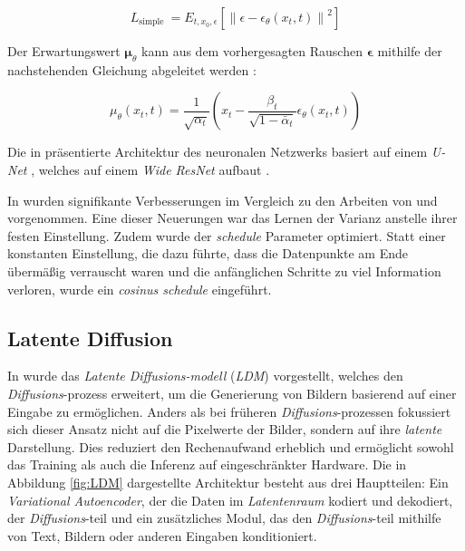 \documentclass[
  a4paper,  %
  twoside,  %
  bibliography=totoc,
  headsepline,
  cleardoublepage=empty,
  parskip=half,
  draft=false
]{scrbook}
\begin{document}
{\begin{equation}
    L_{\text {simple }}=E_{t, x_0, \epsilon}\left[\left\|\epsilon-\epsilon_\theta\left(x_t, t\right)\right\|^2\right]
\end{equation}

Der Erwartungswert $\boldsymbol{\mu}_\theta$ kann aus dem vorhergesagten Rauschen $\boldsymbol{\epsilon}$ mithilfe der nachstehenden Gleichung abgeleitet werden \cite{ho_denoising_2020}:

\begin{equation}
    \mu_\theta\left(x_t, t\right)=\frac{1}{\sqrt{\alpha_t}}\left(x_t-\frac{\beta_t}{\sqrt{1-\bar{\alpha}_t}} \epsilon_\theta\left(x_t, t\right)\right)
\end{equation}

Die in \cite{ho_denoising_2020} präsentierte Architektur des neuronalen Netzwerks basiert auf einem \emph{U-Net} \cite{ronneberger_u-net_2015}, welches auf einem \emph{Wide ResNet} \cite{zagoruyko_wide_2017} aufbaut \cite{ho_denoising_2020}.

In \cite{nichol_improved_2021} wurden signifikante Verbesserungen im Vergleich zu den Arbeiten von \cite{sohl-dickstein_deep_2015} und \cite{ho_denoising_2020} vorgenommen. Eine dieser Neuerungen war das Lernen der Varianz anstelle ihrer festen Einstellung. Zudem wurde der \emph{schedule} Parameter optimiert. Statt einer konstanten Einstellung, die dazu führte, dass die Datenpunkte am Ende übermäßig verrauscht waren und die anfänglichen Schritte zu viel Information verloren, wurde ein \emph{cosinus schedule} eingeführt. \cite{nichol_improved_2021}

\subsection{Latente Diffusion}

In \cite{rombach_high-resolution_2022} wurde das \emph{Latente \emph{Diffusions}-modell} (\emph{LDM}) vorgestellt, welches den \emph{Diffusions}-prozess \cite{sohl-dickstein_deep_2015, ho_denoising_2020, nichol_improved_2021, dhariwal_diffusion_2021} erweitert, um die Generierung von Bildern basierend auf einer Eingabe zu ermöglichen. Anders als bei früheren \emph{Diffusions}-prozessen fokussiert sich dieser Ansatz nicht auf die Pixelwerte der Bilder, sondern auf ihre \emph{latente} Darstellung. Dies reduziert den Rechenaufwand erheblich und ermöglicht sowohl das Training als auch die Inferenz auf eingeschränkter Hardware. Die in Abbildung \ref{fig:LDM} dargestellte Architektur besteht aus drei Hauptteilen: Ein \emph{Variational Autoencoder}, der die Daten im \emph{Latentenraum} kodiert und dekodiert, der \emph{Diffusions}-teil und ein zusätzliches Modul, das den \emph{Diffusions}-teil mithilfe von Text, Bildern oder anderen Eingaben konditioniert. \cite{rombach_high-resolution_2022}

}
\end{document}
